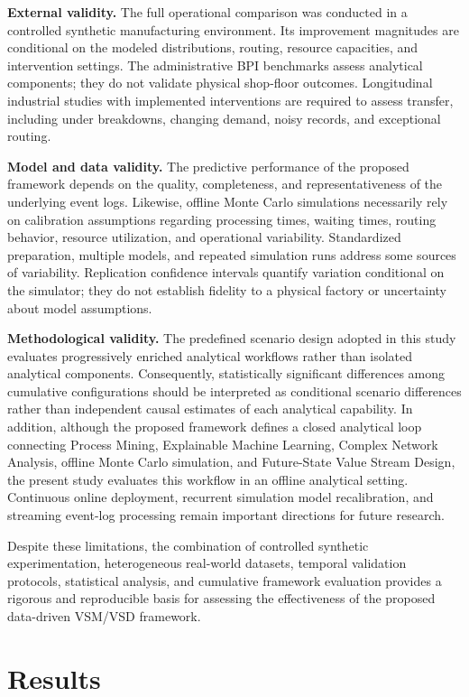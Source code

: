 \documentclass[pdflatex,iicol,Numbered,sn-basic]{sn-jnl}
\begin{document}
\textbf{External validity.}
The full operational comparison was conducted in a controlled synthetic manufacturing environment. Its improvement magnitudes are conditional on the modeled distributions, routing, resource capacities, and intervention settings. The administrative BPI benchmarks assess analytical components; they do not validate physical shop-floor outcomes. Longitudinal industrial studies with implemented interventions are required to assess transfer, including under breakdowns, changing demand, noisy records, and exceptional routing.

\textbf{Model and data validity.}
The predictive performance of the proposed framework depends on the quality, completeness, and representativeness of the underlying event logs. Likewise, offline Monte Carlo simulations necessarily rely on calibration assumptions regarding processing times, waiting times, routing behavior, resource utilization, and operational variability. Standardized preparation, multiple models, and repeated simulation runs address some sources of variability. Replication confidence intervals quantify variation conditional on the simulator; they do not establish fidelity to a physical factory or uncertainty about model assumptions.

\textbf{Methodological validity.}
The predefined scenario design adopted in this study evaluates progressively enriched analytical workflows rather than isolated analytical components. Consequently, statistically significant differences among cumulative configurations should be interpreted as conditional scenario differences rather than independent causal estimates of each analytical capability. In addition, although the proposed framework defines a closed analytical loop connecting Process Mining, Explainable Machine Learning, Complex Network Analysis, offline Monte Carlo simulation, and Future-State Value Stream Design, the present study evaluates this workflow in an offline analytical setting. Continuous online deployment, recurrent simulation model recalibration, and streaming event-log processing remain important directions for future research.

Despite these limitations, the combination of controlled synthetic experimentation, heterogeneous real-world datasets, temporal validation protocols, statistical analysis, and cumulative framework evaluation provides a rigorous and reproducible basis for assessing the effectiveness of the proposed data-driven VSM/VSD framework.

\section{Results}
\label{sec:results}
\end{document}
